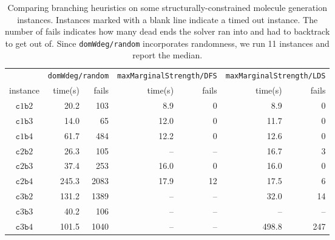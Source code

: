 \documentclass[../Document.tex]{subfiles}
\begin{document}
\begin{table}[H]
    \centering
    \begin{tabular}{crrrrrr}
        \hline
        & \multicolumn{2}{c}{\texttt{domWdeg/random}} &  \multicolumn{2}{c}{\texttt{maxMarginalStrength/DFS}} & \multicolumn{2}{c}{\texttt{maxMarginalStrength/LDS}}\\
        instance & time(s) & fails & time(s) & fails & time(s) & fails \\
        \hline
        $\mathtt{c}1\mathtt{b}2$ & 20.2 & 103 &  8.9 & 0 & 8.9 & 0\\
        $\mathtt{c}1\mathtt{b}3$ & 14.0 & 65 &  12.0 & 0 & 11.7 & 0\\
        $\mathtt{c}1\mathtt{b}4$ & 61.7 & 484 & 12.2 & 0 & 12.6 & 0\\
        $\mathtt{c}2\mathtt{b}2$ & 26.3 & 105 &  -- & -- & 16.7 & 3\\
        $\mathtt{c}2\mathtt{b}3$ & 37.4 & 253 & 16.0 & 0 & 16.0 & 0\\
        $\mathtt{c}2\mathtt{b}4$ & 245.3 & 2083 &  17.9 & 12 & 17.5 & 6\\
        $\mathtt{c}3\mathtt{b}2$ & 131.2 & 1389 & -- & -- & 32.0 & 14\\
        $\mathtt{c}3\mathtt{b}3$ & 40.2 & 106 &  -- & -- & -- & --\\
        $\mathtt{c}3\mathtt{b}4$ & 101.5 & 1040 &  -- & -- & 498.8 & 247\\
        \hline
    \end{tabular}
    \caption[Comparing branching heuristics on some structurally-constrained molecule generation instances.]{Comparing branching heuristics on some structurally-constrained molecule generation instances. Instances marked with a blank line indicate a timed out instance. The number of fails indicates how many dead ends the solver ran into and had to backtrack to get out of. Since \texttt{domWdeg/random} incorporates randomness, we run 11 instances and report the median.}
    \label{tab:structural-results}
\end{table}
\end{document}
